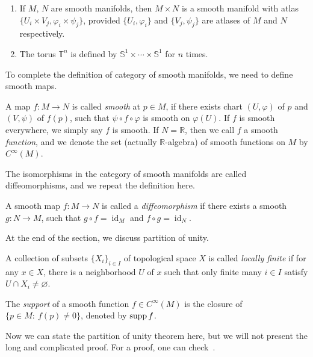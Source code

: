 \begin{eg}
    \begin{enumerate}[(1)]
        \item If $M$, $N$ are smooth manifolds, then $M\times N$ is a smooth manifold with atlas $\{U_i\times V_j,\varphi_i\times\psi_j\}$, provided $\{U_i,\varphi_i\}$ and $\{V_j,\psi_j\}$ are atlases of $M$ and $N$ respectively.
        \item The torus $\mathbb{T}^n$ is defined by $\mathbb{S}^1\times\cdots\times\mathbb{S}^1$ for $n$ times.
    \end{enumerate}
\end{eg}

To complete the definition of category of smooth manifolds, we need to define smooth maps.
\begin{defn}
    A map $f:M\to N$ is called \emph{smooth} at $p\in M$, if there exists chart $(U,\varphi)$ of $p$ and $(V,\psi)$ of $f(p)$, such that $\psi\circ f\circ\varphi$ is smooth on $\varphi(U)$.
    If $f$ is smooth everywhere, we simply say $f$ is smooth.
    If $N=\mathbb{R}$, then we call $f$ a smooth \emph{function}, and we denote the set (actually $\mathbb{R}$-algebra) of smooth functions on $M$ by $C^\infty(M)$.
\end{defn}

The isomorphisms in the category of smooth manifolds are called diffeomorphisms, and we repeat the definition here.
\begin{defn}
    A smooth map $f:M\to N$ is called a \emph{diffeomorphism} if there exists a smooth $g:N\to M$, such that $g\circ f=\operatorname{id}_M$ and $f\circ g=\operatorname{id}_N$.
\end{defn}

At the end of the section, we discuss partition of unity.

\begin{defn}
    A collection of subsets $\{X_i\}_{i\in I}$ of topological space $X$ is called \emph{locally finite} if for any $x\in X$, there is a neighborhood $U$ of $x$ such that only finite many $i\in I$ satisfy $U\cap X_i\neq\varnothing$.
\end{defn}

\begin{defn}
    The \emph{support} of a smooth function $f\in C^\infty(M)$ is the closure of $\{p\in M:\ f(p)\neq 0\}$, denoted by $\operatorname{supp}{f}$.
\end{defn}

Now we can state the partition of unity theorem here, but we will not present the long and complicated proof.
For a proof, one can check~\cite[Theorem~2.23]{LeeSM}.

